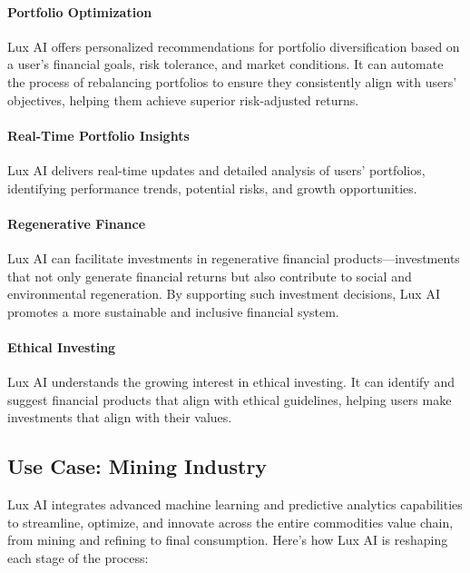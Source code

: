 \documentclass[11pt]{article}
\begin{document}
\paragraph{Portfolio Optimization}

Lux AI offers personalized recommendations for portfolio diversification based on a user's financial goals, risk tolerance, and market conditions. It can automate the process of rebalancing portfolios to ensure they consistently align with users' objectives, helping them achieve superior risk-adjusted returns.


\paragraph{Real-Time Portfolio Insights}

Lux AI delivers real-time updates and detailed analysis of users' portfolios, identifying performance trends, potential risks, and growth opportunities.


\paragraph{Regenerative Finance}

Lux AI can facilitate investments in regenerative financial products---investments that not only generate financial returns but also contribute to social and environmental regeneration. By supporting such investment decisions, Lux AI promotes a more sustainable and inclusive financial system.


\paragraph{Ethical Investing}

Lux AI understands the growing interest in ethical investing. It can identify and suggest financial products that align with ethical guidelines, helping users make investments that align with their values.


\subsection{Use Case: Mining Industry}

Lux AI integrates advanced machine learning and predictive analytics capabilities to streamline, optimize, and innovate across the entire commodities value chain, from mining and refining to final consumption. Here's how Lux AI is reshaping each stage of the process:
\end{document}
